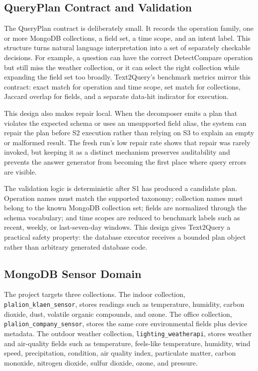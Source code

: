 \documentclass[11pt]{article}
\newcommand{\klaencol}{\texttt{plalion\_\allowbreak klaen\_\allowbreak sensor}}
\newcommand{\companycol}{\texttt{plalion\_\allowbreak company\_\allowbreak sensor}}
\newcommand{\weathercol}{\texttt{lighting\_\allowbreak weatherapi}}
\begin{document}
\subsection{QueryPlan Contract and Validation}

The QueryPlan contract is deliberately small. It records the operation family, one or more MongoDB collections, a field set, a time scope, and an intent label. This structure turns natural language interpretation into a set of separately checkable decisions. For example, a question can have the correct DetectCompare operation but still miss the weather collection, or it can select the right collection while expanding the field set too broadly. Text2Query's benchmark metrics mirror this contract: exact match for operation and time scope, set match for collections, Jaccard overlap for fields, and a separate data-hit indicator for execution.

This design also makes repair local. When the decomposer emits a plan that violates the expected schema or uses an unsupported field alias, the system can repair the plan before S2 execution rather than relying on S3 to explain an empty or malformed result. The fresh run's low repair rate shows that repair was rarely invoked, but keeping it as a distinct mechanism preserves auditability and prevents the answer generator from becoming the first place where query errors are visible.

The validation logic is deterministic after S1 has produced a candidate plan. Operation names must match the supported taxonomy; collection names must belong to the known MongoDB collection set; fields are normalized through the schema vocabulary; and time scopes are reduced to benchmark labels such as recent, weekly, or last-seven-day windows. This design gives Text2Query a practical safety property: the database executor receives a bounded plan object rather than arbitrary generated database code.

\subsection{MongoDB Sensor Domain}

The project targets three collections. The indoor collection, \klaencol{}, stores readings such as temperature, humidity, carbon dioxide, dust, volatile organic compounds, and ozone. The office collection, \companycol{}, stores the same core environmental fields plus device metadata. The outdoor weather collection, \weathercol{}, stores weather and air-quality fields such as temperature, feels-like temperature, humidity, wind speed, precipitation, condition, air quality index, particulate matter, carbon monoxide, nitrogen dioxide, sulfur dioxide, ozone, and pressure.
\end{document}
